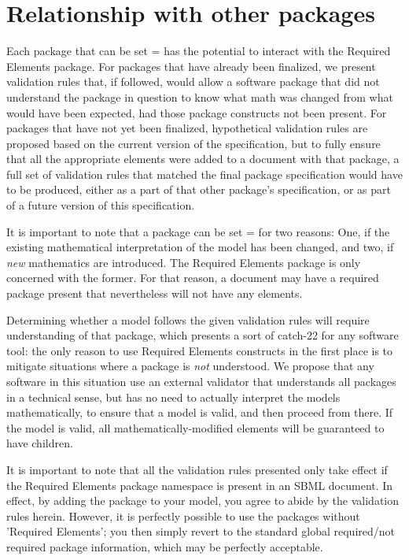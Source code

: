 
\section{Relationship with other packages}
\label{other-packages}

Each package that can be set = has the potential to interact with the Required Elements package.  For packages that have already been finalized, we present validation rules that, if followed, would allow a software package that did not understand the package in question to know what math was changed from what would have been expected, had those package constructs not been present.  For packages that have not yet been finalized, hypothetical validation rules are proposed based on the current version of the specification, but to fully ensure that all the appropriate \MathChangedClaim elements were added to a document with that package, a full set of validation rules that matched the final package specification would have to be produced, either as a part of that other package's specification, or as part of a future version of this specification.

It is important to note that a package can be set = for two reasons:  One, if the existing mathematical interpretation of the model has been changed, and two, if \emph{new} mathematics are introduced.  The Required Elements package is only concerned with the former.  For that reason, a document may have a required package present that nevertheless will not have any \MathChangedClaim elements.

Determining whether a model follows the given validation rules will require understanding of that package, which presents a sort of catch-22 for any software tool:  the only reason to use Required Elements constructs in the first place is to mitigate situations where a package is \emph{not} understood.  We propose that any software in this situation use an external validator that understands all packages in a technical sense, but has no need to actually interpret the models mathematically, to ensure that a model is valid, and then proceed from there.  If the model is valid, all mathematically-modified elements will be guaranteed to have \MathChangedClaim children.

It is important to note that all the validation rules presented only take effect if the Required Elements package namespace is present in an SBML document.  In effect, by adding the package to your model, you agree to abide by the validation rules herein.  However, it is perfectly possible to use the packages without 'Required Elements'; you then simply revert to the standard global required/not required package information, which may be perfectly acceptable.


